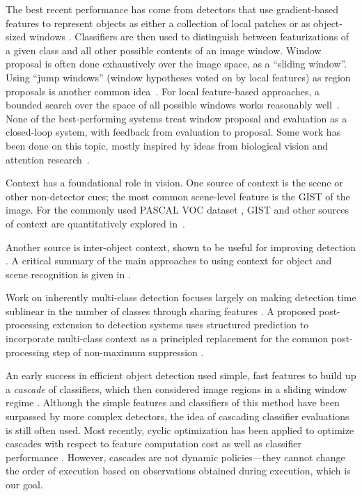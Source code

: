 The best recent performance has come from detectors that use gradient-based features to represent objects as either a collection of local patches or as object-sized windows \cite{Dalal2005,Lowe2004}.
Classifiers are then used to distinguish between featurizations of a given class and all other possible contents of an image window.
%
Window proposal is often done exhaustively over the image space, as a ``sliding window''.
Using ``jump windows'' (window hypotheses voted on by local features) as region proposals is another common idea~\cite{Vedaldi2009,Vijayanarasimhan2011}.
For local feature-based approaches, a bounded search over the space of all possible windows works reasonably well~\cite{Lampert2008a}.
%
None of the best-performing systems treat window proposal and evaluation as a closed-loop system, with feedback from evaluation to proposal.
Some work has been done on this topic, mostly inspired by ideas from biological vision and attention research~\cite{Butko2009,Vogel2008,Paletta2005}.

Context has a foundational role in vision.
One source of context is the scene or other non-detector cues; the most common scene-level feature is the GIST \cite{Oliva2001a} of the image.
For the commonly used PASCAL VOC dataset \cite{pascal-voc-2010}, GIST and other sources of context are quantitatively explored in~\cite{Divvala2009}. 

Another source is inter-object context, shown to be useful for improving detection \cite{Torralba2004}.
A critical summary of the main approaches to using context for object and scene recognition is given in \cite{Galleguillos2010}.

Work on inherently multi-class detection focuses largely on making detection time sublinear in the number of classes through sharing features \cite{Torralba2007,Fan2005,Razavi2011}.
A proposed post-processing extension to detection systems uses structured prediction to incorporate multi-class context as a principled replacement for the common post-processing step of non-maximum suppression \cite{Desai2009}.

An early success in efficient object detection used simple, fast features to build up a \emph{cascade} of classifiers, which then considered image regions in a sliding window regime \cite{Viola2001}.
Although the simple features and classifiers of this method have been surpassed by more complex detectors, the idea of cascading classifier evaluations is still often used.
Most recently, cyclic optimization has been applied to optimize cascades with respect to feature computation cost as well as classifier performance \cite{Chen2012}.
However, cascades are not dynamic policies---they cannot change the order of execution based on observations obtained during execution, which is our goal.

